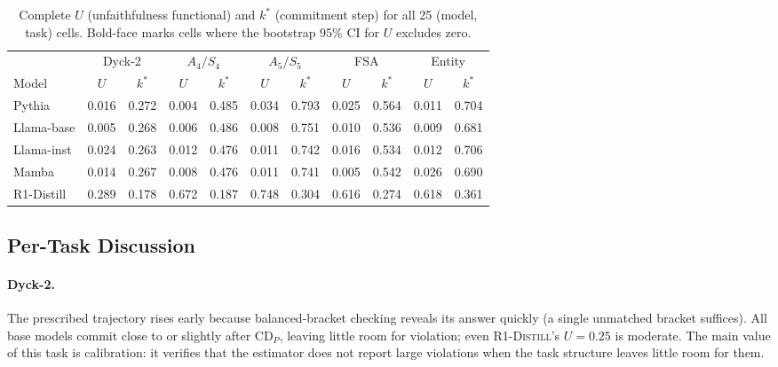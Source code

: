 \documentclass[11pt]{article}
\newcommand{\CDP}{\mathrm{CD}_{P}}
\newcommand{\stepk}{k}
\newcommand{\Rdistill}{\textsc{R1-Distill}}
\begin{document}
\begin{table}[t]
\centering\small
\setlength{\tabcolsep}{4pt}
\begin{tabular}{@{}l cc cc cc cc cc@{}}
\toprule
& \multicolumn{2}{c}{Dyck-2}
& \multicolumn{2}{c}{$A_4/S_4$}
& \multicolumn{2}{c}{$A_5/S_5$}
& \multicolumn{2}{c}{FSA}
& \multicolumn{2}{c}{Entity} \\
\cmidrule(lr){2-3}\cmidrule(lr){4-5}\cmidrule(lr){6-7}\cmidrule(lr){8-9}\cmidrule(lr){10-11}
Model & $U$ & $\stepk^{*}$ & $U$ & $\stepk^{*}$ & $U$ & $\stepk^{*}$ & $U$ & $\stepk^{*}$ & $U$ & $\stepk^{*}$ \\
\midrule
Pythia      & 0.016 & 0.272 & 0.004 & 0.485 & 0.034 & 0.793 & 0.025 & 0.564 & 0.011 & 0.704 \\
Llama-base  & 0.005 & 0.268 & 0.006 & 0.486 & 0.008 & 0.751 & 0.010 & 0.536 & 0.009 & 0.681 \\
Llama-inst  & 0.024 & 0.263 & 0.012 & 0.476 & 0.011 & 0.742 & 0.016 & 0.534 & 0.012 & 0.706 \\
Mamba       & 0.014 & 0.267 & 0.008 & 0.476 & 0.011 & 0.741 & 0.005 & 0.542 & 0.026 & 0.690 \\
R1-Distill  & 0.289 & 0.178 & 0.672 & 0.187 & 0.748 & 0.304 & 0.616 & 0.274 & 0.618 & 0.361 \\
\bottomrule
\end{tabular}
\caption{Complete $U$ (unfaithfulness functional) and $\stepk^{*}$ (commitment
step) for all 25 (model, task) cells.
Bold-face marks cells where the bootstrap 95\% CI for $U$ excludes zero.}
\label{tab:full-uk}
\end{table}

\subsection{Per-Task Discussion}

\paragraph{Dyck-2.}
The prescribed trajectory rises early because balanced-bracket checking reveals
its answer quickly (a single unmatched bracket suffices). All base models commit
close to or slightly after $\CDP$, leaving little room for violation; even
\Rdistill's $U=0.25$ is moderate. The main value of this task is calibration:
it verifies that the estimator does not report large violations when the task
structure leaves little room for them.
\end{document}
